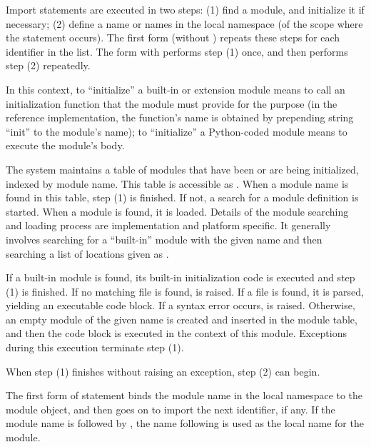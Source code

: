 Import statements are executed in two steps: (1) find a module, and
initialize it if necessary; (2) define a name or names in the local
namespace (of the scope where the  statement occurs).
The first form (without ) repeats these steps for each
identifier in the list.  The form with  performs step
(1) once, and then performs step (2) repeatedly.

In this context, to ``initialize'' a built-in or extension module means to
call an initialization function that the module must provide for the purpose
(in the reference implementation, the function's name is obtained by
prepending string ``init'' to the module's name); to ``initialize'' a
Python-coded module means to execute the module's body.
  
The system maintains a table of modules that have been or are being
initialized,
indexed by module name.  This table is
accessible as .  When a module name is found in
this table, step (1) is finished.  If not, a search for a module
definition is started.  When a module is found, it is loaded.  Details
of the module searching and loading process are implementation and
platform specific.  It generally involves searching for a ``built-in''
module with the given name and then searching a list of locations
given as .

If a built-in module is found, its
built-in initialization code is executed and step (1) is finished.  If
no matching file is found,
 is raised.
If a file is found, it is parsed,
yielding an executable code block.  If a syntax error occurs,
 is raised.  Otherwise, an
empty module of the given name is created and inserted in the module
table, and then the code block is executed in the context of this
module.  Exceptions during this execution terminate step (1).

When step (1) finishes without raising an exception, step (2) can
begin.

The first form of  statement binds the module name in
the local namespace to the module object, and then goes on to import
the next identifier, if any.  If the module name is followed by
, the name following  is used as the local
name for the module. 

